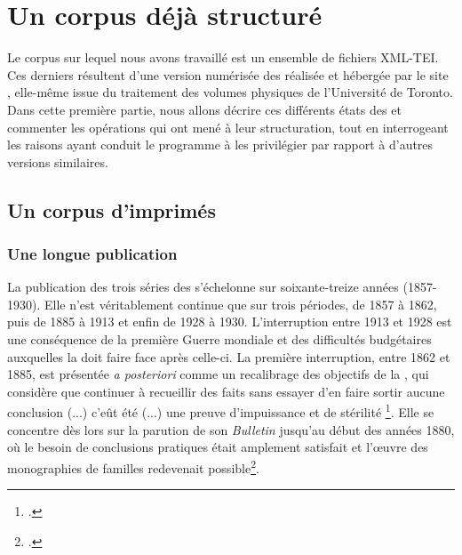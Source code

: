 \part{Un corpus déjà structuré}

\clearpage
\thispagestyle{empty}
\cleardoublepage
{}
Le corpus sur lequel nous avons travaillé est un ensemble de fichiers XML-TEI. Ces derniers résultent d'une version numérisée des \odm{} réalisée et hébergée par le site \ia, elle-même issue du traitement des volumes physiques de l'Université de Toronto. Dans cette première partie, nous allons décrire ces différents états des \odm{} et commenter les opérations qui ont mené à leur structuration, tout en interrogeant les raisons ayant conduit le programme \timeus{} à les privilégier par rapport à d'autres versions similaires.

\newpage
\thispagestyle{empty}
\mbox{}
\newpage

\chapter{Un corpus d'imprimés}

\section{Une longue publication}
\label{part:I1_longue_pub}

La publication des trois séries des \odm{} s'échelonne sur soixante-treize années (1857-1930). Elle n'est véritablement continue que sur trois périodes, de 1857 à 1862, puis de 1885 à 1913 et enfin de 1928 à 1930. L'interruption entre 1913 et 1928 est une conséquence de la première Guerre mondiale et des difficultés budgétaires auxquelles la \sess{} doit faire face après celle-ci. La première interruption, entre 1862 et 1885, est présentée \textit{a posteriori} comme un recalibrage des objectifs de la \sess, qui considère que \og continuer à recueillir des faits sans essayer d'en faire sortir aucune conclusion (...) c'eût été (...) une preuve d'impuissance et de stérilité \fg{}\footcite[p. I]{averts1t5}. Elle se concentre dès lors sur la parution de son \textit{Bulletin} jusqu'au début des années 1880, où \og le besoin de conclusions pratiques était amplement satisfait \fg{} et \og  l'œuvre des monographies de familles \fg{} redevenait possible\footcite[p. II]{averts1t5}.

